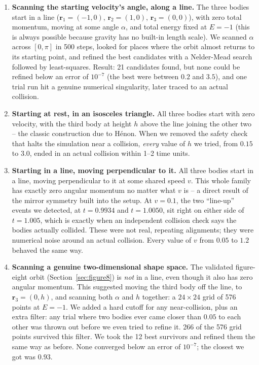 \documentclass[11pt]{article}
\begin{document}
\begin{enumerate}
  \item \textbf{Scanning the starting velocity's angle, along a line.}
    The three bodies start in a line
    ($\mathbf{r}_1=(-1,0)$, $\mathbf{r}_2=(1,0)$, $\mathbf{r}_3=(0,0)$),
    with zero total momentum, moving at some angle $\alpha$, and total
    energy fixed at $E=-1$ (this is always possible because gravity has
    no built-in length scale). We scanned $\alpha$ across $[0,\pi]$ in
    500 steps, looked for places where the orbit almost returns to its
    starting point, and refined the best candidates with a Nelder-Mead
    search followed by least-squares. Result: 21 candidates found, but
    none could be refined below an error of $10^{-7}$ (the best were
    between $0.2$ and $3.5$), and one trial run hit a genuine numerical
    singularity, later traced to an actual collision.
  \item \textbf{Starting at rest, in an isosceles triangle.} All three
    bodies start with zero velocity, with the third body at height $h$
    above the line joining the other two -- the classic construction due
    to H\'enon. When we removed the safety check that halts the
    simulation near a collision, \emph{every} value of $h$ we tried, from
    $0.15$ to $3.0$, ended in an actual collision within 1--2 time units.
  \item \textbf{Starting in a line, moving perpendicular to it.} All
    three bodies start in a line, moving perpendicular to it at some
    shared speed $v$. This whole family has exactly zero angular momentum
    no matter what $v$ is -- a direct result of the mirror symmetry built
    into the setup. At $v=0.1$, the two ``line-up'' events we detected, at
    $t=0.9934$ and $t=1.0050$, sit right on either side of $t=1.005$,
    which is exactly when an independent collision check says the bodies
    actually collided. These were not real, repeating alignments; they
    were numerical noise around an actual collision. Every value of $v$
    from $0.05$ to $1.2$ behaved the same way.
  \item \textbf{Scanning a genuine two-dimensional shape space.} The
    validated figure-eight orbit (Section~\ref{sec:figure8}) is
    \emph{not} in a line, even though it also has zero angular momentum.
    This suggested moving the third body off the line, to
    $\mathbf{r}_3=(0,h)$, and scanning both $\alpha$ and $h$ together: a
    $24\times24$ grid of 576 points at $E=-1$. We added a hard cutoff for
    any near-collision, plus an extra filter: any trial where two bodies
    ever came closer than $0.05$ to each other was thrown out before we
    even tried to refine it. 266 of the 576 grid points survived this
    filter. We took the 12 best survivors and refined them the same way
    as before. None converged below an error of $10^{-7}$; the closest we
    got was $0.93$.
\end{enumerate}
\end{document}
